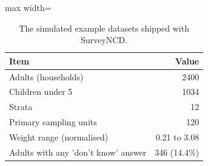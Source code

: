 \begin{table}[htbp]

\caption{\label{tab:tab_dataset}The simulated example datasets shipped with SurveyNCD.}
\centering
\small
\begin{adjustbox}{max width=\linewidth}
\begin{tabular}{lr}
\toprule
Item & Value\\
\midrule
Adults (households) & 2400\\
Children under 5 & 1034\\
Strata & 12\\
Primary sampling units & 120\\
Weight range (normalised) & 0.21 to 3.08\\
Adults with any 'don't know' answer & 346 (14.4\%)\\
\bottomrule
\end{tabular}
\end{adjustbox}
\end{table}
